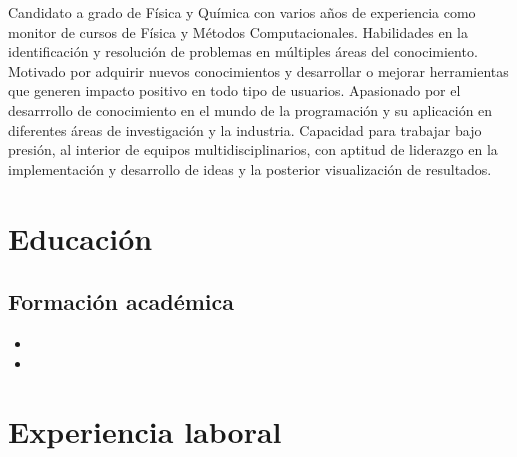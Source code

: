 \documentclass[11pt, letterpaper, sans]{moderncv}        %
\begin{document}
\maketitle

\small{
Candidato a grado de Física y Química con varios años de experiencia como monitor de cursos de Física y Métodos Computacionales. Habilidades en la identificación y resolución de problemas en múltiples áreas del conocimiento. Motivado por adquirir nuevos conocimientos y desarrollar o mejorar herramientas que generen impacto positivo en todo tipo de usuarios. Apasionado por el desarrrollo de conocimiento en el mundo de la programación y su aplicaci\'on en diferentes \'areas de investigaci\'on y la industria. Capacidad para trabajar bajo presión, al interior de equipos multidisciplinarios, con aptitud de liderazgo en la implementaci\'on y desarrollo de ideas y la posterior visualizaci\'on de resultados.
}

\section{Educación}

\vspace{5pt}

\subsection{Formación académica}

\vspace{5pt}

\begin{itemize}

\item{}
\item{}

\end{itemize}

\vspace{2pt}

\section{Experiencia laboral}
\end{document}
